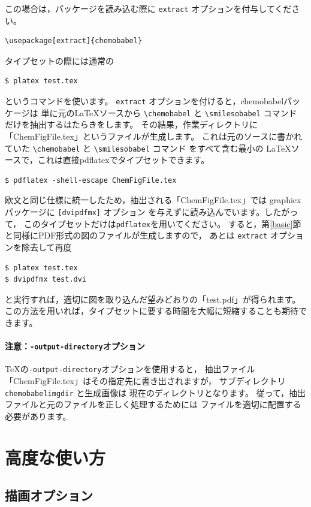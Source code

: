 \documentclass[12pt]{ltjsarticle}
\def\Lpack#1{\textsf{#1}}
\def\Lcode#1{\texttt{#1}}
\begin{document}
この場合は，パッケージを読み込む際に \verb|extract| オプションを付与してください。
\begin{verbatim}
\usepackage[extract]{chemobabel}
\end{verbatim}
タイプセットの際には通常の
\begin{verbatim}
$ platex test.tex
\end{verbatim}
というコマンドを使います。
\verb|extract| オプションを付けると，\Lpack{chemobabel}パッケージは
単に元の\LaTeX ソースから \verb|\chemobabel| と \verb|\smilesobabel| コマンド
だけを抽出するはたらきをします。
その結果，作業ディレクトリに「ChemFigFile.tex」というファイルが生成します。
これは元のソースに書かれていた \verb|\chemobabel| と \verb|\smilesobabel| コマンド
をすべて含む最小の \LaTeX ソースで，これは直接pdflatexでタイプセットできます。
\begin{verbatim}
$ pdflatex -shell-escape ChemFigFile.tex
\end{verbatim}
欧文と同じ仕様に統一したため，抽出される「ChemFigFile.tex」では
\Lpack{graphicx}パッケージに \verb+[dvipdfmx]+ オプション
を与えずに読み込んでいます。したがって，
このタイプセットだけは\Lcode{pdflatex}を用いてください。
すると，第\ref{basic}節と同様にPDF形式の図のファイルが生成しますので，
あとは \verb|extract| オプションを除去して再度
\begin{verbatim}
$ platex test.tex
$ dvipdfmx test.dvi
\end{verbatim}
と実行すれば，適切に図を取り込んだ望みどおりの「test.pdf」が得られます。
この方法を用いれば，タイプセットに要する時間を大幅に短縮することも期待できます。

\paragraph{注意：\Lcode{-output-directory}オプション}

\TeX の\Lcode{-output-directory}オプションを使用すると，
抽出ファイル「ChemFigFile.tex」はその指定先に書き出されますが，
サブディレクトリ \verb|chemobabelimgdir| と生成画像は
現在のディレクトリとなります。
従って，抽出ファイルと元のファイルを正しく処理するためには
ファイルを適切に配置する必要があります。

\clearpage

\section{高度な使い方}

\subsection{描画オプション}
\label{depict}
\end{document}
